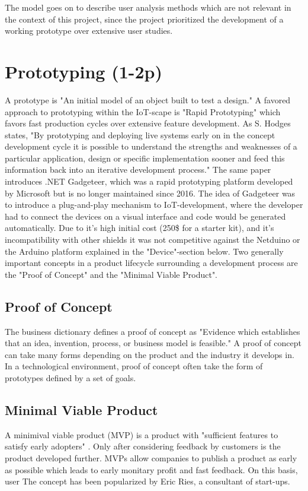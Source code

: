 The model goes on to describe user analysis methods which are not relevant in the context of this project, 
since the project prioritized the development of a working prototype over extensive user studies. 

\section{Prototyping (1-2p)}
A prototype is "An initial model of an object built to test a design." \parencite{prototypeDef}
A favored approach to prototyping within the IoT-scape is "Rapid Prototyping" 
which favors fast production cycles over extensive feature development. 
As S. Hodges states, "By prototyping and deploying live systems early on in the concept development cycle it is possible to understand the strengths and weaknesses of a particular application, design or specific implementation sooner 
and feed this information back into an iterative development process." \parencite{rapidProto3}
The same paper introduces .NET Gadgeteer, which was a rapid prototyping platform developed by Microsoft but is no longer maintained since 2016.
The idea of Gadgeteer was to introduce a plug-and-play mechanism to IoT-development, where the developer had to connect the devices on a visual interface and code would be generated automatically.
Due to it's high initial cost (250\$ for a starter kit), 
and it's incompatibility with other shields it was not competitive against the Netduino or the Arduino platform explained in the "Device"-section below.
Two generally important concepts in a product lifecycle surrounding a development process 
are the "Proof of Concept" and the "Minimal Viable Product".

\subsection{Proof of Concept}
The business dictionary defines a proof of concept as "Evidence which establishes that an idea, invention, process, or business model is feasible."
\parencite{PoC}
A proof of concept can take many forms depending on the product and the industry it develops in. 
In a technological environment, proof of concept often take the form of prototypes defined by a set of goals.

\subsection{Minimal Viable Product}
A minimival viable product (MVP) is a product with "sufficient features to satisfy early adopters" \parencite{mvp}. 
Only after considering feedback by customers is the product developed further. 
MVPs allow companies to publish a product as early as possible which leads to early monitary profit and fast feedback. 
On this basis, user
The concept has been popularized by Eric Ries, a consultant of start-ups.


